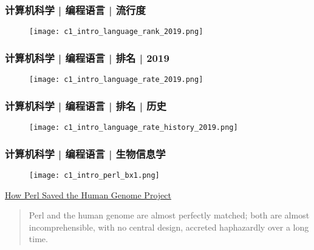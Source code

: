 \begin{frame}
  \frametitle{计算机科学 | 编程语言 | 流行度}
  \begin{figure}
    \centering
    \texttt{[image: c1\_intro\_language\_rank\_2019.png]}
  \end{figure}
\end{frame}

\begin{frame}
  \frametitle{计算机科学 | 编程语言 | 排名 | 2019}
  \begin{figure}
    \centering
    \texttt{[image: c1\_intro\_language\_rate\_2019.png]}
  \end{figure}
\end{frame}


\begin{frame}
  \frametitle{计算机科学 | 编程语言 | 排名 | 历史}
  \begin{figure}
    \centering
    \texttt{[image: c1\_intro\_language\_rate\_history\_2019.png]}
  \end{figure}
\end{frame}

\begin{frame}
  \frametitle{计算机科学 | 编程语言 | 生物信息学}
  \begin{figure}
    \centering
    \texttt{[image: c1\_intro\_perl\_bx1.png]}
  \end{figure}
  \begin{flushright}
    \href{https://web.stanford.edu/class/gene211/handouts/How_Perl_HGP.html}{How Perl Saved the Human Genome Project}
  \end{flushright}
  \begin{quotation}
Perl and the human genome are almost perfectly matched; both are almost incomprehensible, with no central design, accreted haphazardly over a long time.
  \end{quotation}
\end{frame}

